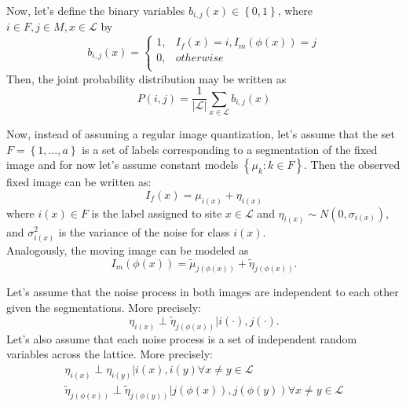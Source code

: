 \documentclass[11pt]{article}
\begin{document}
Now, let's define the binary variables $b_{i,j}(x) \in \left\lbrace 0,1\right\rbrace$, where $i \in F, j\in M, x\in \mathcal{L}$ by
\begin{equation}
	b_{i,j}(x) = \left\lbrace\begin{array}{ll}
					1, & I_f(x)=i, I_m(\phi(x))=j\\
					0, & otherwise\\
				\end{array}\right.
\end{equation}
Then, the joint probability distribution may be written as
\begin{equation}
	P(i,j) = \frac{1}{|\mathcal{L}|} \sum_{x\in \mathcal{L}}b_{i,j}(x)
\end{equation}

Now, instead of assuming a regular image quantization, let's assume that the set $F=\left\lbrace 1,...,a\right\rbrace$ is a set of labels corresponding to a segmentation of the fixed image and for now let's assume constant models $\left\lbrace \mu_{k}: k\in F\right\rbrace$. Then the observed fixed image can be written as:
\begin{equation}
	I_{f}(x) = \mu_{i(x)} + \eta_{i(x)}
\end{equation}
where $i(x)\in F$ is the label assigned to site $x\in \mathcal{L}$ and $\eta_{i(x)} \sim N(0, \sigma_{i(x)})$, and $\sigma_{i(x)}^{2}$ is the variance of the noise for class $i(x)$.\\

Analogously, the moving image can be modeled as
\begin{equation}
	I_{m}(\phi(x)) = \tilde{\mu}_{j(\phi(x))} + \tilde{\eta}_{j(\phi(x))}.
\end{equation}

Let's assume that the noise process in both images are independent to each other given the segmentations. More precisely:
\begin{equation}
	\eta_{i(x)} \perp \tilde{\eta}_{j(\phi(x))}| i(\cdot), j(\cdot).
\end{equation}
Let's also assume that each noise process is a set of independent random variables across the lattice. More precisely:
\begin{equation}
	\begin{array}{l}
		\eta_{i(x)} \perp \eta_{i(y)}| i(x), i(y) \forall x\neq y \in \mathcal{L}\\
		\tilde{\eta}_{j(\phi(x))} \perp \tilde{\eta}_{j(\phi(y))}| j(\phi(x)), j(\phi(y)) \forall x\neq y \in \mathcal{L}\\
	\end{array}
\end{equation}
\end{document}
